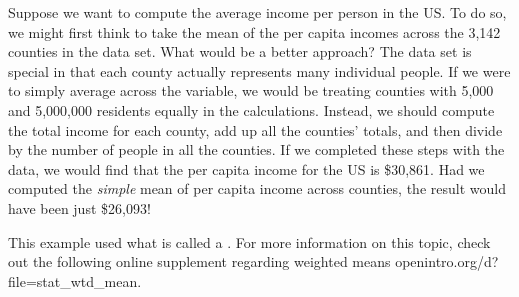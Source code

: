 
\begin{examplewrap}
\begin{nexample}{Suppose we want to compute the average income
    per person in the US.
    To do so, we might first think to take
    the mean of the per capita incomes across the 3,142 counties
    in the  data set.
    What would be a better approach?}
    \label{wtdMeanOfIncome}
  The  data set is special in that each county
  actually represents many individual people.
  If we were to simply average across the 
  variable, we would be treating counties with 5,000 and
  5,000,000 residents equally in the calculations.
  Instead, we should compute the total income for each county,
  add up all the counties' totals, and then divide by the number
  of people in all the counties.
  If we completed these steps with the  data,
  we would find that the per capita income for the US is
  \$30,861.
  Had we computed the \emph{simple} mean of per capita income
  across counties, the result would have been just \$26,093!

  This example used what is called a
  .
  For more information
  on this topic, check out the following
  online supplement regarding weighted means
      {openintro.org/d?file=stat\_wtd\_mean}.
\end{nexample}
\end{examplewrap}

